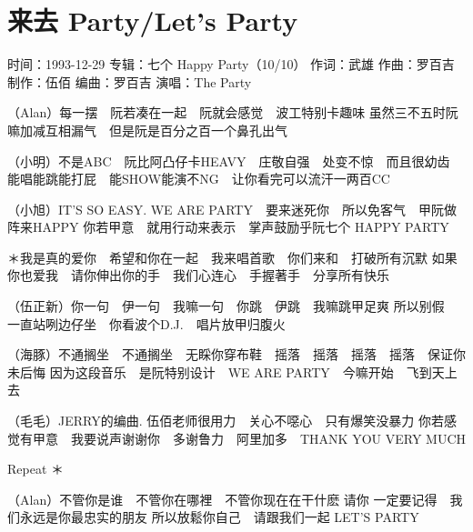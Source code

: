 \documentclass[UTF8,a4paper,oneside,twocolumn,12pt]{ctexbook}
\newcommand{\infopair}[2]{\textbullet #1：#2}
\newcommand{\zc}[1][伍佰]{\infopair{作词}{#1}}
\newcommand{\zq}[1][伍佰]{\infopair{作曲}{#1}}
\newcommand{\bq}[1][伍佰]{\infopair{编曲}{#1}}
\newcommand{\zj}[1]{\infopair{专辑}{#1}}
\newcommand{\zz}[1]{\infopair{制作}{#1}}
\newcommand{\sj}[1]{\infopair{时间}{#1}}
\newenvironment{info}{\begin{flushleft}\kaishu
	}
	{\end{flushleft}\normalsize\yahei\par}
\newenvironment{lyric}{
	}
{}
\begin{document}
\section{来去 Party/Let's Party}
\begin{info}
	\sj{1993-12-29}
	\zj{七个 Happy Party（10/10）}
	\zc[武雄]
	\zq[罗百吉]
	\zz{伍佰}
	\bq[罗百吉]
	\infopair{演唱}{The Party}
\end{info}
\begin{lyric}
	（Alan）每一摆　阮若凑在一起　阮就会感觉　波工特别卡趣味
	虽然三不五时阮嘛加减互相漏气　但是阮是百分之百一个鼻孔出气

	（小明）不是ABC　阮比阿凸仔卡HEAVY　庄敬自强　处变不惊　而且很幼齿
	能唱能跳能打屁　能SHOW能演不NG　让你看完可以流汗一两百CC

	（小旭）IT'S SO EASY. WE ARE PARTY　要来迷死你　所以免客气　甲阮做阵来HAPPY
	你若甲意　就用行动来表示　掌声鼓励乎阮七个 HAPPY PARTY

	＊我是真的爱你　希望和你在一起　我来唱首歌　你们来和　打破所有沉默
	如果你也爱我　请你伸出你的手　我们心连心　手握著手　分享所有快乐

	（伍正新）你一句　伊一句　我嘛一句　你跳　伊跳　我嘛跳甲足爽
	所以别假　一直站咧边仔坐　你看波个D.J.　唱片放甲归腹火

	（海豚）不通搁坐　不通搁坐　无睬你穿布鞋　摇落　摇落　摇落　摇落　保证你未后悔
	因为这段音乐　是阮特别设计　WE ARE PARTY　今嘛开始　飞到天上去

	（毛毛）JERRY的编曲. 伍佰老师很用力　关心不噁心　只有爆笑没暴力
	你若感觉有甲意　我要说声谢谢你　多谢鲁力　阿里加多　THANK YOU VERY MUCH

	Repeat ＊

	（Alan）不管你是谁　不管你在哪裡　不管你现在在干什麽
	请你 一定要记得　我们永远是你最忠实的朋友
	所以放鬆你自己　请跟我们一起
	LET'S PARTY
\end{lyric}
\end{document}
